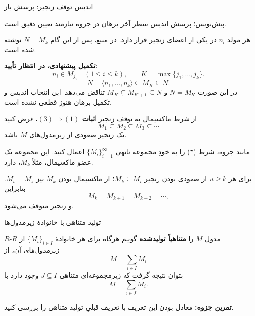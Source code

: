 \begin{frame}[t]{اندیس توقف زنجیر: پرسش باز}
    \label{lec10:noetherian-maximal-index}
    \begin{tblock}{پیش‌نویس؛ پرسش }
        اندیس سطر آخر برهان در جزوه نیازمند تعیین دقیق است.
    \end{tblock}
    هر مولد $n_i$ در یکی از اعضای زنجیر قرار دارد.
    در منبع، پس از این گام $N=M_k$ نوشته شده است.

    \textbf{تکمیل پیشنهادی، در انتظار تأیید:}
    \[
        n_i\in M_{j_i}\quad(1\leq i\leq k),\qquad
        K=\max\{j_1,\ldots,j_k\}.
    \]
    \[
        N=\langle n_1,\ldots,n_k\rangle\subseteq M_K\subseteq N.
    \]
    در این صورت $N=M_K$ و
    $M_K\subsetneq M_{K+1}\subseteq N$ تناقض می‌دهد.
    این انتخاب اندیس و تکمیل برهان هنوز قطعی نشده است.
\end{frame}

\begin{frame}[t]{از شرط ماکسیمال به توقف زنجیر}
    \label{lec10:noetherian-acc}
    \textbf{اثبات \((3)\Longrightarrow(1)\).}
    فرض کنید
    \[
        M_1\subseteq M_2\subseteq M_3\subseteq\cdots
    \]
    یک زنجیر صعودی از زیرمدول‌های $M$ باشد.

    مانند جزوه، شرط (۳) را به خودِ مجموعهٔ ناتهی
    $\{M_i\}_{i=1}^{\infty}$ اعمال کنید.
    این مجموعه یک عضو ماکسیمال، مثلاً $M_k$، دارد.

    برای هر $i\geq k$، از صعودی بودن زنجیر $M_k\subseteq M_i$؛
    از ماکسیمال بودن $M_k$ نیز $M_i=M_k$. بنابراین
    \[
        M_k=M_{k+1}=M_{k+2}=\cdots,
    \]
    و زنجیر متوقف می‌شود.
\end{frame}

\begin{frame}[t]{تولید متناهی با خانوادهٔ زیرمدول‌ها}
    \label{lec10:finite-generation-family}
    \begin{definition}
        $R$-مدول $M$ را \textbf{متناهیاً تولیدشده} گوییم هرگاه
        برای هر خانوادهٔ $\{M_i\}_{i\in I}$ از $R$-زیرمدول‌های آن،
        از
        \[
            M=\sum_{i\in I}M_i
        \]
        بتوان نتیجه گرفت که زیرمجموعه‌ای متناهی $J\subseteq I$ وجود دارد با
        \[
            M=\sum_{i\in J}M_i.
        \]
    \end{definition}
    \textbf{تمرین جزوه:} معادل بودن این تعریف با تعریف قبلیِ
    تولید متناهی را بررسی کنید.
\end{frame}

